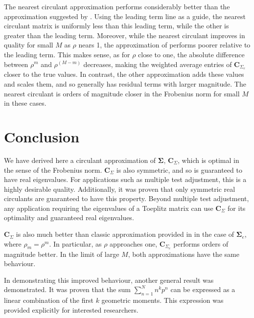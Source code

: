 \documentclass[letterpaper,12pt,oneside,final]{article}
\newcommand{\m}[1]{\mathbf{#1}}               %
\newcommand{\sm}[1]{\boldsymbol{#1}}   %
\begin{document}
The nearest circulant approximation performs considerably better than the approximation suggested by \cite{gray2006toeplitz}. Using the leading term line as a guide, the nearest circulant matrix is uniformly less than this leading term, while the other is greater than the leading term. Moreover, while the nearest circulant improves in quality for small $M$ as $\rho$ nears 1, the approximation of \cite{gray2006toeplitz} performs poorer relative to the leading term. This makes sense, as for $\rho$ close to one, the absolute difference between $\rho^m$ and $\rho^{(M-m)}$ decreases, making the weighted average entries of $\m{C}_{\Sigma_e}$ closer to the true values. In contrast, the other approximation adds these values and scales them, and so generally has residual terms with larger magnitude. The nearest circulant is orders of magnitude closer in the Frobenius norm for small $M$ in these cases.

\section{Conclusion} \label{sec:conc}

We have derived here a circulant approximation of $\sm{\Sigma}$, $\m{C}_{\Sigma}$, which is optimal in the sense of the Frobenius norm. $\m{C}_{\Sigma}$ is also symmetric, and so is guaranteed to have real eigenvalues. For applications such as multiple test adjustment, this is a highly desirable quality. Additionally, it was proven that only symmetric real circulants are guaranteed to have this property. Beyond multiple test adjustment, any application requiring the eigenvalues of a Toeplitz matrix can use $\m{C}_{\Sigma}$ for its optimality and guaranteed real eigenvalues.

$\m{C}_{\Sigma}$ is also much better than classic approximation provided in \cite{grenanderszego1958} in the case of $\sm{\Sigma}_e$, where $\rho_m = \rho^m$. In particular, as $\rho$ approaches one, $\m{C}_{\Sigma_e}$ performs orders of magnitude better. In the limit of large $M$, both approximations have the same behaviour.

In demonstrating this improved behaviour, another general result was demonstrated. It was proven that the sum $\sum_{n = 1}^{N} n^k p^n$ can be expressed as a linear combination of the first $k$ geometric moments. This expression was provided explicitly for interested researchers.


\renewcommand*{\bibname}{References} %

\end{document}
